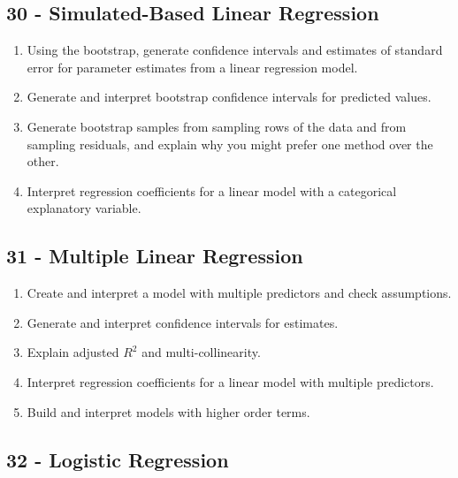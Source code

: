 \documentclass[
  letterpaper,
  DIV=11,
  numbers=noendperiod]{scrreprt}
\begin{document}
\subsection*{30 - Simulated-Based Linear
Regression}\label{simulated-based-linear-regression}

\begin{enumerate}
\def\labelenumi{\arabic{enumi})}
\item
  Using the bootstrap, generate confidence intervals and estimates of
  standard error for parameter estimates from a linear regression model.
\item
  Generate and interpret bootstrap confidence intervals for predicted
  values.
\item
  Generate bootstrap samples from sampling rows of the data and from
  sampling residuals, and explain why you might prefer one method over
  the other.
\item
  Interpret regression coefficients for a linear model with a
  categorical explanatory variable.
\end{enumerate}

\subsection*{31 - Multiple Linear
Regression}\label{multiple-linear-regression}

\begin{enumerate}
\def\labelenumi{\arabic{enumi})}
\item
  Create and interpret a model with multiple predictors and check
  assumptions.
\item
  Generate and interpret confidence intervals for estimates.
\item
  Explain adjusted \(R^2\) and multi-collinearity.
\item
  Interpret regression coefficients for a linear model with multiple
  predictors.
\item
  Build and interpret models with higher order terms.
\end{enumerate}

\subsection*{32 - Logistic Regression}\label{logistic-regression}
\end{document}
